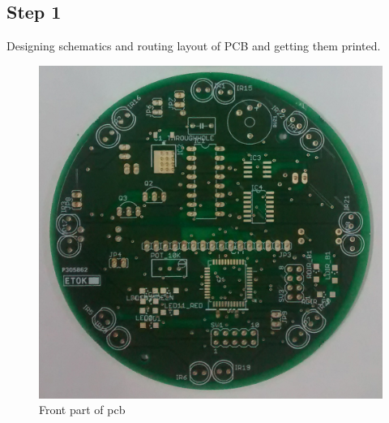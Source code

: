 \documentclass[a4paper,12pt,oneside]{book}
\begin{document}
\subsection*{Step 1}
Designing schematics and routing layout of PCB and getting them printed.
\hfill\\
\begin{figure}[h!]
	\caption{Front part of pcb}
	\includegraphics[width=\textwidth]{./Pictures/PCB_front}		
\end{figure}	
\hfill\\
\newpage
\end{document}
